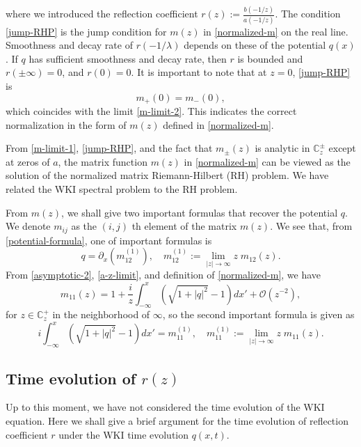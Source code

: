 \documentclass[11pt]{article}
\newcommand{\CC}{{\mathbb C}}
\begin{document}
 where we introduced the reflection coefficient $r(z):=\frac{b(-1/z)}{a(-1/z)}$. The condition \eqref{jump-RHP} is the jump condition for $m(z)$ in \eqref{normalized-m} on the real line. Smoothness and decay rate of $r(-1/\lambda)$ depends on these of the potential $q(x)$. If $q$ has sufficient smoothness and decay rate, then $r$ is bounded and $r(\pm\infty)=0$, and $r(0)=0$. It is important to note that at $z=0$, \eqref{jump-RHP} is 
 $$m_{+}(0)=m_-(0),$$   
 which coincides with the limit \eqref{m-limit-2}. This indicates the correct normalization in the form of $m(z)$ defined in \eqref{normalized-m}.
 
From \eqref{m-limit-1}, \eqref{jump-RHP}, and the fact that $m_{\pm}(z)$ is analytic in $\CC^{\pm}_z$ except at zeros of $a$, the matrix function $m(z)$ in \eqref{normalized-m} can be viewed as the solution of the normalized matrix Riemann-Hilbert (RH) problem. We have related the WKI spectral problem to the RH problem. 
 
From $m(z)$, we shall give two important formulas that recover the potential $q$. We denote $m_{ij}$ as the $(i,j)$ th element of the matrix $m(z)$. We see that, from \eqref{potential-formula}, one of important formulas is
\begin{equation}\label{recover-q} 
q=\partial_x(m_{12}^{(1)}), \quad m_{12}^{(1)}:=\lim_{|z|\rightarrow \infty}z\;m_{12}(z).  
\end{equation}
From \eqref{asymptotic-2}, \eqref{a-z-limit}, and definition of \eqref{normalized-m}, we have 
 $$m_{11}(z)=1+\frac{i}{z}\int_{-\infty}^{x}(\sqrt{1+|q|^2} -1)dx'+\mathcal{O}(z^{-2}),$$
for $z\in \CC^+_z$ in the neighborhood of $\infty$, so the second important formula is given as 
\begin{equation}\label{recover-H}
i\int_{-\infty}^{x}(\sqrt{1+|q|^2} -1)dx'=m_{11}^{(1)}, \quad m_{11}^{(1)}:=\lim_{|z|\rightarrow \infty}z\; m_{11}(z).
\end{equation}  
 
\subsection{Time evolution of $r(z)$} Up to this moment, we have not considered the time evolution of the WKI equation. Here we shall give a brief argument for the time evolution of reflection coefficient $r$ under the WKI time evolution $q(x,t)$.
 
\end{document}
